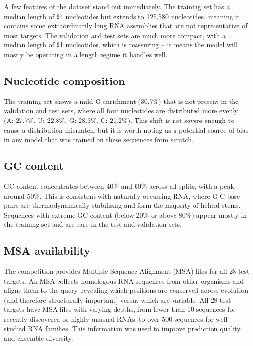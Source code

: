 \documentclass[11pt,a4paper]{article}
\begin{document}
A few features of the dataset stand out immediately. The training set has a median length of 94 nucleotides but extends to 125,580 nucleotides, meaning it contains some extraordinarily long RNA assemblies that are not representative of most targets. The validation and test sets are much more compact, with a median length of 91 nucleotides, which is reassuring -- it means the model will mostly be operating in a length regime it handles well.

\subsection{Nucleotide composition}

The training set shows a mild G enrichment (30.7\%) that is not present in the validation and test sets, where all four nucleotides are distributed more evenly (A: 27.7\%, U: 22.8\%, G: 28.3\%, C: 21.2\%). This shift is not severe enough to cause a distribution mismatch, but it is worth noting as a potential source of bias in any model that was trained on these sequences from scratch.

\subsection{GC content}

GC content concentrates between 40\% and 60\% across all splits, with a peak around 50\%. This is consistent with naturally occurring RNA, where G-C base pairs are thermodynamically stabilising and form the majority of helical stems. Sequences with extreme GC content (below 20\% or above 80\%) appear mostly in the training set and are rare in the test and validation sets.

\subsection{MSA availability}

The competition provides Multiple Sequence Alignment (MSA) files for all 28 test targets. An MSA collects homologous RNA sequences from other organisms and aligns them to the query, revealing which positions are conserved across evolution (and therefore structurally important) versus which are variable. All 28 test targets have MSA files with varying depths, from fewer than 10 sequences for recently discovered or highly unusual RNAs, to over 500 sequences for well-studied RNA families. This information was used to improve prediction quality and ensemble diversity.
\end{document}
